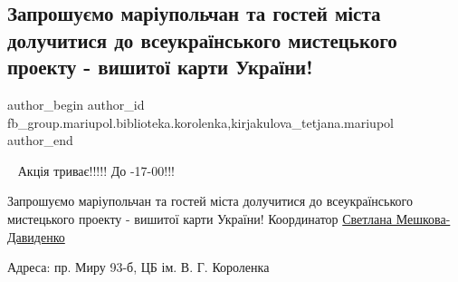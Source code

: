  
 
 
 
 

\subsection{Запрошуємо маріупольчан та гостей міста долучитися до всеукраїнського мистецького проекту - вишитої карти України!}
\label{sec:29_12_2017.fb.fb_group.mariupol.biblioteka.korolenka.1.zaproshu_mo_mar_upol}
 
\ifcmt
 author_begin
   author_id fb_group.mariupol.biblioteka.korolenka,kirjakulova_tetjana.mariupol
 author_end
\fi

📢📢📢Акція триває!!!!! До -17-00!!!

Запрошуємо маріупольчан та гостей міста долучитися до всеукраїнського
мистецького проекту - вишитої карти України! Координатор \href{https://www.facebook.com/cwetlana.ptica}{Светлана
Мешкова-Давиденко}

Адреса: пр. Миру 93-б, ЦБ ім. В. Г. Короленка

